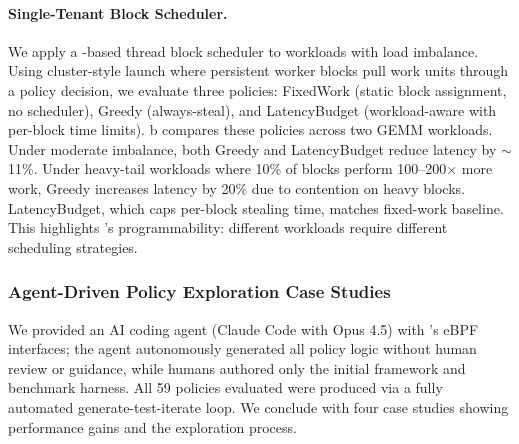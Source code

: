 \paragraph{Single-Tenant Block Scheduler.}
We apply a \sys-based thread block scheduler to workloads with load imbalance.
Using cluster-style launch where persistent worker blocks pull work units through a policy decision, we evaluate three policies: FixedWork (static block assignment, no scheduler), Greedy (always-steal), and LatencyBudget (workload-aware with per-block time limits).
b compares these policies across two GEMM workloads.
Under moderate imbalance, both Greedy and LatencyBudget reduce latency by $\sim$11\%.
Under heavy-tail workloads where 10\% of blocks perform 100--200$\times$ more work, Greedy increases latency by 20\% due to contention on heavy blocks.
LatencyBudget, which caps per-block stealing time, matches fixed-work baseline.
This highlights \sys's programmability: different workloads require different scheduling strategies.

\subsubsection{Agent-Driven Policy Exploration Case Studies}
\label{sec:rq1-agent}

We provided an AI coding agent (Claude Code with Opus 4.5) with \sys{}'s eBPF interfaces; the agent autonomously generated all policy logic without human review or guidance, while humans authored only the initial framework and benchmark harness.
All 59 policies evaluated were produced via a fully automated generate-test-iterate loop.
We conclude with four case studies showing performance gains and the exploration process.

